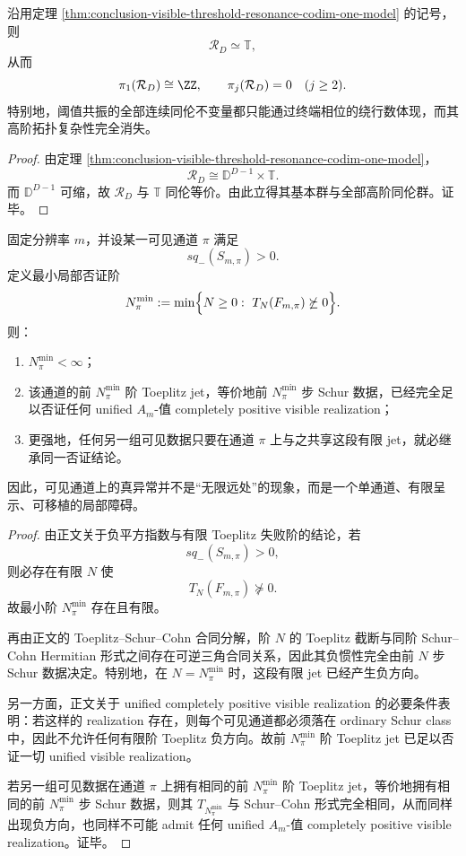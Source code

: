 \begin{corollary}[阈值共振参数域的拓扑刚性]\label{cor:conclusion-visible-threshold-resonance-topological-rigidity}
沿用定理 \ref{thm:conclusion-visible-threshold-resonance-codim-one-model} 的记号，则
\[
\mathcal R_D\simeq \mathbb T,
\]
从而
\[
\pi_1(\mathcal R_D)\cong \ZZ,
\qquad
\pi_j(\mathcal R_D)=0\quad (j\ge 2).
\]
特别地，阈值共振的全部连续同伦不变量都只能通过终端相位的绕行数体现，而其高阶拓扑复杂性完全消失。
\end{corollary}
\begin{proof}
由定理 \ref{thm:conclusion-visible-threshold-resonance-codim-one-model}，
\[
\mathcal R_D\cong \mathbb D^{D-1}\times \mathbb T.
\]
而 \(\mathbb D^{D-1}\) 可缩，故 \(\mathcal R_D\) 与 \(\mathbb T\) 同伦等价。由此立得其基本群与全部高阶同伦群。证毕。
\end{proof}

\begin{theorem}\label{thm:conclusion-visible-channel-anomaly-finite-presentation}
固定分辨率 \(m\)，并设某一可见通道 \(\pi\) 满足
\[
sq_-(S_{m,\pi})>0.
\]
定义最小局部否证阶
\[
N_\pi^{\min}:=
\min\Bigl\{
N\ge 0:\ T_N(F_{m,\pi})\not\succeq 0
\Bigr\}.
\]
则：
\begin{enumerate}
  \item \(N_\pi^{\min}<\infty\)；
  \item 该通道的前 \(N_\pi^{\min}\) 阶 Toeplitz jet，等价地前 \(N_\pi^{\min}\) 步 Schur 数据，已经完全足以否证任何 unified \(A_m\)-值 completely positive visible realization；
  \item 更强地，任何另一组可见数据只要在通道 \(\pi\) 上与之共享这段有限 jet，就必继承同一否证结论。
\end{enumerate}
因此，可见通道上的真异常并不是“无限远处”的现象，而是一个单通道、有限呈示、可移植的局部障碍。
\end{theorem}
\begin{proof}
由正文关于负平方指数与有限 Toeplitz 失败阶的结论，若
\[
sq_-(S_{m,\pi})>0,
\]
则必存在有限 \(N\) 使
\[
T_N(F_{m,\pi})\not\succeq 0.
\]
故最小阶 \(N_\pi^{\min}\) 存在且有限。

再由正文的 Toeplitz--Schur--Cohn 合同分解，阶 \(N\) 的 Toeplitz 截断与同阶 Schur--Cohn Hermitian 形式之间存在可逆三角合同关系，因此其负惯性完全由前 \(N\) 步 Schur 数据决定。特别地，在 \(N=N_\pi^{\min}\) 时，这段有限 jet 已经产生负方向。

另一方面，正文关于 unified completely positive visible realization 的必要条件表明：若这样的 realization 存在，则每个可见通道都必须落在 ordinary Schur class 中，因此不允许任何有限阶 Toeplitz 负方向。故前 \(N_\pi^{\min}\) 阶 Toeplitz jet 已足以否证一切 unified visible realization。

若另一组可见数据在通道 \(\pi\) 上拥有相同的前 \(N_\pi^{\min}\) 阶 Toeplitz jet，等价地拥有相同的前 \(N_\pi^{\min}\) 步 Schur 数据，则其 \(T_{N_\pi^{\min}}\) 与 Schur--Cohn 形式完全相同，从而同样出现负方向，也同样不可能 admit 任何 unified \(A_m\)-值 completely positive visible realization。证毕。
\end{proof}

